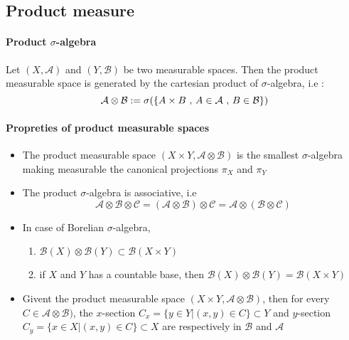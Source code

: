 \documentclass[a4paper,10pt]{article}
\begin{document}
\subsection{Product measure}
\paragraph{Product $\sigma$-algebra} Let $(X,\mathcal{A})$ and $(Y,\mathcal{B})$ be two measurable spaces. Then the product measurable space is generated by the cartesian product of $\sigma$-algebra, i.e :
\[
\mathcal{A} \otimes \mathcal{B} := \sigma (\{A \times B \hbox{ , } A \in \mathcal{A} \hbox{ , }  B \in \mathcal{B} \})
\]
\paragraph{Propreties of product measurable spaces}
\begin{itemize}
\renewcommand{\labelitemi}{$\vcenter{\hbox{\tiny$\bullet$}}$}
 \item The product measurable space $(X\times Y, \mathcal{A}\otimes\mathcal{B})$ is the smallest $\sigma$-algebra making measurable the canonical projections $\pi_{X}$ and $\pi_{Y}$
 \item The product $\sigma$-algebra is associative, i.e 
  \[
    \mathcal{A} \otimes \mathcal{B} \otimes \mathcal{C} = (\mathcal{A} \otimes \mathcal{B}) \otimes \mathcal{C} = \mathcal{A} \otimes( \mathcal{B} \otimes \mathcal{C})
  \]
  \item In case of Borelian $\sigma$-algebra,
  \begin{enumerate}[i]
   \item $\mathcal{B}(X) \otimes \mathcal{B}(Y) \subset \mathcal{B}(X\times Y)$
   \item if $X$ and $Y$ has a countable base, then $\mathcal{B}(X) \otimes \mathcal{B}(Y) = \mathcal{B}(X\times Y)$
  \end{enumerate}
  \item Givent the product measurable space $(X\times Y, \mathcal{A}\otimes\mathcal{B})$, then for every $C \in \mathcal{A}\otimes\mathcal{B})$, the $x$-section $C_x=\{y\in Y | (x,y) \in C \} \subset Y$  and $y$-section $C_y=\{x\in X | (x,y) \in C \} \subset X$ are respectively in $\mathcal{B}$ and $\mathcal{A}$
\end{itemize}
\end{document}
